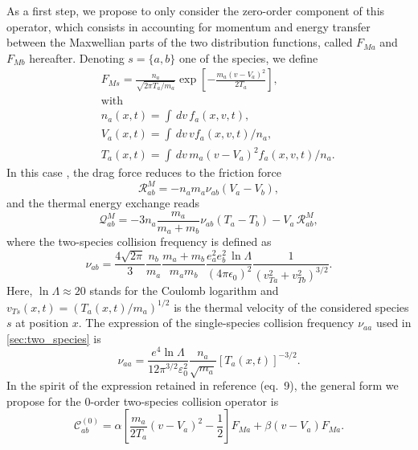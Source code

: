 \documentclass[11pt]{article}
\begin{document}
 As a first step, we propose to only consider the zero-order component of this operator, which consists in accounting for momentum and energy transfer between the Maxwellian parts of the two distribution functions, called $F_{Ma}$ and $F_{Mb}$ hereafter. Denoting $s=\{a,b\}$ one of the species, we define
\begin{eqnarray} 
&& F_{Ms} = \frac{n_a}{\sqrt{2\pi T_a/m_a}} \exp\left[ -\frac{m_a(v-V_a)^2}{2T_a}\right], \\
&& \textrm{with} \nonumber \\
&& n_a(x,t) = \int \,d v \, f_a(x,v,t), \nonumber \\
&& V_a(x,t) = \int \,d v \, vf_a(x,v,t) / n_a, \nonumber \\
&& T_a(x,t) = \int \,d v \, m_a(v-V_a)^2f_a(x,v,t) / n_a. \nonumber 
\end{eqnarray}
%
In this case \cite{Hinton1983}, the drag force reduces to the friction force
%
\begin{equation}  \label{eq:def_RM}
\mathcal{R}_{ab}^M = -n_am_a\nu_{ab}(V_a-V_b),
\end{equation} 
%
and the thermal energy exchange reads
%
\begin{equation}  \label{eq:def_QM}
\mathcal{Q}_{ab}^M = -3 n_a\frac{m_a}{m_a+m_b}\nu_{ab}(T_a-T_b) - V_a\, \mathcal{R}_{ab}^M,
\end{equation} 
%
where the two-species collision frequency is defined as
%
\begin{equation}  \label{eq:def_nuab}
\nu_{ab} = \frac{4\sqrt{2\pi}}{3} \frac{n_b}{m_a}\frac{m_a+m_b}{m_am_b} 
\frac{e_a^2e_b^2\, \ln\Lambda}{(4\pi\epsilon_0)^2} 
\frac{1}{(v_{Ta}^2+v_{Tb}^2)^{3/2}}.
\end{equation} 
%
Here, $\ln\Lambda \approx20$ stands for the Coulomb logarithm and $v_{Ts}(x,t) = (T_a(x,t)/m_a)^{1/2}$ is the thermal velocity of the considered species $s$ at position $x$. The expression of the single-species collision frequency $\nu_{aa}$ used in \cref{sec:two_species} is
%
\begin{equation}\label{eq:nu_aa}
  \nu_{aa} = \dfrac{e^{4}\ln \Lambda}{12 \pi^{3/2} \varepsilon_0^{2}} \dfrac{n_a}{\sqrt{m_a}  }\left[ T_a(x,t) \right]^{-3/2}.
\end{equation}
%
In the spirit of the expression retained in reference \cite{Esteve2015} (eq.\ 9), the general form we propose for the 0-order two-species collision operator is
%
\begin{equation*}
\mathcal{C}_{ab}^{(0)} = \alpha \left[ \frac{m_a}{2T_a}(v-V_a)^2 - \frac{1}{2}\right] F_{Ma} 
+ \beta (v-V_a) F_{Ma}.
\end{equation*} 
\end{document}
